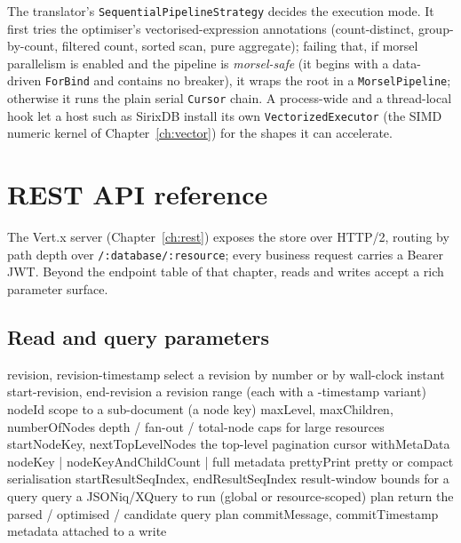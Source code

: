 \documentclass[11pt,a4paper,oneside]{report}
\newcommand{\dcap}[1]{\par\vspace{1pt}\noindent{\small\sffamily\bfseries\color{slate}#1}\par\vspace{-2pt}}
\theoremstyle{sirixthm}
\newcommand{\code}[1]{\texttt{#1}}
\begin{document}
\noindent The translator's \code{SequentialPipelineStrategy} decides the execution mode. It first tries
the optimiser's vectorised-expression annotations (count-distinct, group-by-count, filtered count,
sorted scan, pure aggregate); failing that, if morsel parallelism is enabled and the pipeline is
\emph{morsel-safe} (it begins with a data-driven \code{ForBind} and contains no breaker), it wraps the
root in a \code{MorselPipeline}; otherwise it runs the plain serial \code{Cursor} chain. A process-wide
and a thread-local hook let a host such as SirixDB install its own \code{VectorizedExecutor} (the SIMD
numeric kernel of Chapter~\ref{ch:vector}) for the shapes it can accelerate.

\section{REST API reference}
\label{app:rest}

The Vert.x server (Chapter~\ref{ch:rest}) exposes the store over HTTP/2, routing by path depth over
\code{/:database/:resource}; every business request carries a Bearer JWT. Beyond the endpoint table of
that chapter, reads and writes accept a rich parameter surface.

\subsection{Read and query parameters}

\dcap{Read / query parameters}
\begin{diagramS}
revision, revision-timestamp           select a revision by number or by wall-clock instant
start-revision, end-revision           a revision range (each with a -timestamp variant)
nodeId                                 scope to a sub-document (a node key)
maxLevel, maxChildren, numberOfNodes   depth / fan-out / total-node caps for large resources
startNodeKey, nextTopLevelNodes        the top-level pagination cursor
withMetaData                           nodeKey | nodeKeyAndChildCount | full metadata
prettyPrint                            pretty or compact serialisation
startResultSeqIndex, endResultSeqIndex result-window bounds for a query
query                                  a JSONiq/XQuery to run (global or resource-scoped)
plan                                   return the parsed / optimised / candidate query plan
commitMessage, commitTimestamp         metadata attached to a write
\end{diagramS}
\end{document}
